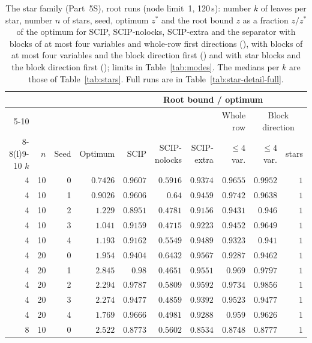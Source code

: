 \begin{table}[ht]
\centering\scriptsize
\setlength{\tabcolsep}{3pt}
\caption{The star family (Part~5S), root runs (node limit~1, 120\,s): number $k$ of leaves per star, number $n$ of stars, seed, optimum $z^\ast$ and the root bound $z$ as a fraction $z/z^\ast$ of the optimum for SCIP, SCIP-nolocks, SCIP-extra and the separator with blocks of at most four variables and whole-row first directions (), with blocks of at most four variables and the block direction first () and with star blocks and the block direction first (); limits in Table~\ref{tab:modes}. The medians per $k$ are those of Table~\ref{tab:stars}. Full runs are in Table~\ref{tab:star-detail-full}.}\label{tab:star-detail}
\begin{tabular}{@{}rrrrrrrrrr@{}}
\toprule
& & & & \multicolumn{6}{c}{Root bound / optimum}\\
\cmidrule(l){5-10}
& & & & & & & Whole row & \multicolumn{2}{c}{Block direction}\\
\cmidrule(lr){8-8}\cmidrule(l){9-10}
$k$ & $n$ & Seed & Optimum & SCIP & SCIP-nolocks & SCIP-extra & $\le4$ var. & $\le4$ var. & stars\\
\midrule
4 & 10 & 0 & $0.7426$ & $0.9607$ & $0.5916$ & $0.9374$ & $0.9655$ & $0.9952$ & $1$\\
4 & 10 & 1 & $0.9026$ & $0.9606$ & $0.64$ & $0.9459$ & $0.9742$ & $0.9638$ & $1$\\
4 & 10 & 2 & $1.229$ & $0.8951$ & $0.4781$ & $0.9156$ & $0.9431$ & $0.946$ & $1$\\
4 & 10 & 3 & $1.041$ & $0.9159$ & $0.4715$ & $0.9223$ & $0.9452$ & $0.9649$ & $1$\\
4 & 10 & 4 & $1.193$ & $0.9162$ & $0.5549$ & $0.9489$ & $0.9323$ & $0.941$ & $1$\\
4 & 20 & 0 & $1.954$ & $0.9404$ & $0.6432$ & $0.9567$ & $0.9287$ & $0.9462$ & $1$\\
4 & 20 & 1 & $2.845$ & $0.98$ & $0.4651$ & $0.9551$ & $0.969$ & $0.9797$ & $1$\\
4 & 20 & 2 & $2.294$ & $0.9787$ & $0.5809$ & $0.9592$ & $0.9734$ & $0.9856$ & $1$\\
4 & 20 & 3 & $2.274$ & $0.9477$ & $0.4859$ & $0.9392$ & $0.9523$ & $0.9477$ & $1$\\
4 & 20 & 4 & $1.769$ & $0.9666$ & $0.4981$ & $0.9288$ & $0.959$ & $0.9626$ & $1$\\
\midrule
8 & 10 & 0 & $2.522$ & $0.8773$ & $0.5602$ & $0.8534$ & $0.8748$ & $0.8777$ & $1$\\

\end{tabular}
\end{table}
